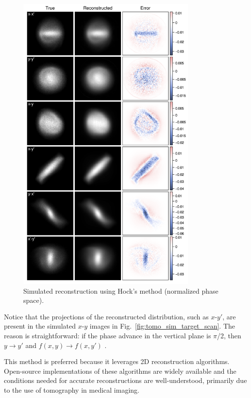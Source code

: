 \begin{figure}[!p]
    \centering
    \includegraphics[width=0.8\textwidth]{Images/chapter4/tomo_sim_rec_hock_proj_2D_ver.png}
    \caption{Simulated reconstruction using Hock's method (normalized phase space).}
    \label{fig:tomo_sim_rec_hock_proj_2D}
\end{figure}
%
Notice that the projections of the reconstructed distribution, such as $x$-$y'$, are present in the simulated $x$-$y$ images in Fig.~\ref{fig:tomo_sim_target_scan}. The reason is straightforward: if the phase advance in the vertical plane is $\pi$/2, then $y \rightarrow y'$ and $f(x, y) \rightarrow f(x, y')$ \cite{Hock2013a}. 

This method is preferred because it leverages 2D reconstruction algorithms. Open-source implementations of these algorithms are widely available and the conditions needed for accurate reconstructions are well-understood, primarily due to the use of tomography in medical imaging.


